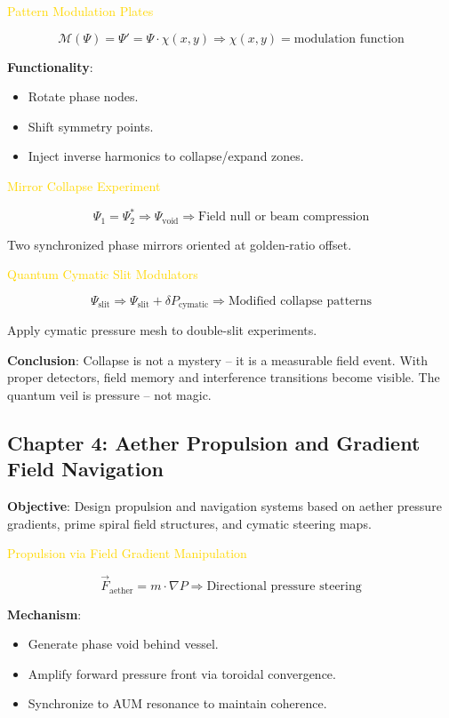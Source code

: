 \textcolor{gold}{ Pattern Modulation Plates }

\[
\mathcal{M}(\Psi) = \Psi' = \Psi \cdot \chi(x, y) \Rightarrow \chi(x, y) = \text{modulation function}
\]

\textbf{Functionality}:
\begin{itemize}
    \item Rotate phase nodes.
    \item Shift symmetry points.
    \item Inject inverse harmonics to collapse/expand zones.
\end{itemize}

\textcolor{gold}{ Mirror Collapse Experiment }

\[
\Psi_1 = \Psi_2^* \Rightarrow \Psi_{\text{void}} \Rightarrow \text{Field null or beam compression}
\]

Two synchronized phase mirrors oriented at golden-ratio offset.

\textcolor{gold}{ Quantum Cymatic Slit Modulators }

\[
\Psi_{\text{slit}} \Rightarrow \Psi_{\text{slit}} + \delta P_{\text{cymatic}} \Rightarrow \text{Modified collapse patterns}
\]

Apply cymatic pressure mesh to double-slit experiments.

\textbf{Conclusion}: Collapse is not a mystery -- it is a measurable field event. With proper detectors, field memory and interference transitions become visible. The quantum veil is pressure -- not magic.

\subsection{Chapter 4: Aether Propulsion and Gradient Field Navigation}

\textbf{Objective}: Design propulsion and navigation systems based on aether pressure gradients, prime spiral field structures, and cymatic steering maps.

\textcolor{gold}{ Propulsion via Field Gradient Manipulation }

\[
\vec{F}_{\text{aether}} = m \cdot \nabla P \Rightarrow \text{Directional pressure steering}
\]

\textbf{Mechanism}:
\begin{itemize}
    \item Generate phase void behind vessel.
    \item Amplify forward pressure front via toroidal convergence.
    \item Synchronize to AUM resonance to maintain coherence.
\end{itemize}

